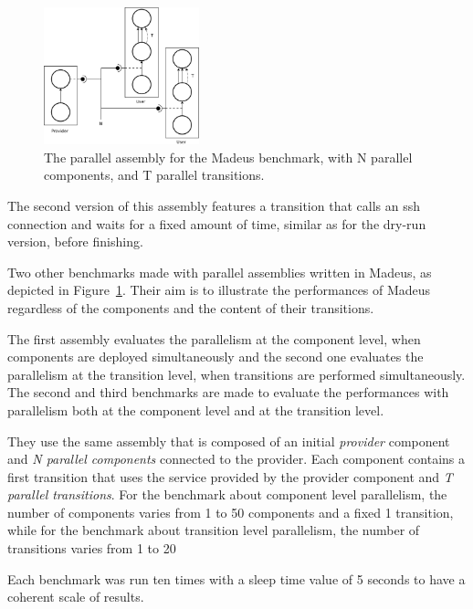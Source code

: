 \begin{figure}[h]
  \begin{center}
    \includegraphics[width=0.4\textwidth]{./images/par.pdf}
    \caption{The parallel assembly for the Madeus benchmark, with N parallel components, and T parallel transitions.}
    \label{fig:par}
  \end{center}
\end{figure}

The second version of this assembly features a transition that calls an ssh connection and waits for a fixed amount of time, similar as for the dry-run version, before finishing. 

Two other benchmarks made with parallel assemblies written in Madeus, as depicted in Figure~\ref{fig:par}.
Their aim is to illustrate the performances of Madeus regardless of the components and the content of their transitions.

The first assembly evaluates the parallelism at the component level, when components are deployed simultaneously and the second one evaluates the parallelism at the transition level, when transitions are performed simultaneously.
The second and third benchmarks are made to evaluate the performances with parallelism both at the component level and at the transition level.

They use the same assembly that is composed of an initial \emph{provider} component and \emph{N parallel components} connected to the provider. Each component contains a first transition that uses the service provided by the provider component and \emph{T parallel transitions}. For the benchmark about component level parallelism, the number of components varies from 1 to 50 components and a fixed 1 transition, while for the benchmark about transition level parallelism, the number of transitions varies from 1 to 20 %

Each benchmark was run ten times with a sleep time value of 5 seconds to have a coherent scale of results.



